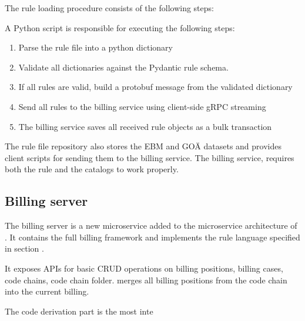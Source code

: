 The rule loading procedure consists of the following steps:

A Python script is responsible for executing the following steps:
\begin{enumerate}
    \item Parse the rule file into a python dictionary
    \item Validate all dictionaries against the Pydantic rule schema.
    \item If all rules are valid, build a  protobuf message from the validated dictionary
    \item Send all rules to the billing service using client-side gRPC streaming
    \item The billing service saves all received rule objects as a bulk transaction
\end{enumerate}

The rule file repository also stores the EBM and GOÄ datasets and provides client scripts for sending them to the billing service.
The billing service, requires both the rule and the catalogs to work properly.


\subsection{Billing server}
The billing server is a new microservice added to the microservice architecture of \AV.
It contains the full billing framework and implements the rule language specified in section \addref.

It exposes APIs for basic CRUD operations on billing positions, billing cases, code chains, code chain folder.
 merges all billing positions from the code chain into the current billing.









The code derivation part is the most inte




